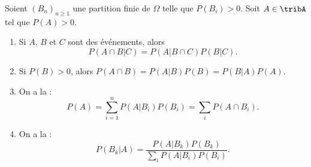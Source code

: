 \begin{theorem}     \label{ThoBayesEtAutres}
    Soient \( (B_n)_{n\geq 1}\) une partition finie de \( \Omega\) telle que \( P(B_i)>0\). Soit \( A\in\tribA\) tel que \( P(A)>0\).
    \begin{enumerate}
        \item
            Si \( A\), \( B\) et \( C\) sont des événements, alors
            \begin{equation}
                P(A\cap B|C)=P(A|B\cap C)P(B|C).
            \end{equation}
        \item
            Si \( P(B)>0\), alors \( P(A\cap B)=P(A|B)P(B)=P(B|A)P(A)\).
        \item On a la  :
            \begin{equation}
                P(A)=\sum_{i=1}^nP(A|B_i)P(B_i)=\sum_iP(A\cap B_i).
            \end{equation}
        \item
            On a la  :
            \begin{equation}
                P(B_k|A)=\frac{ P(A|B_k)P(B_k) }{ \sum_iP(A|B_i)P(B_i) }.
            \end{equation}
    \end{enumerate}
\end{theorem}

